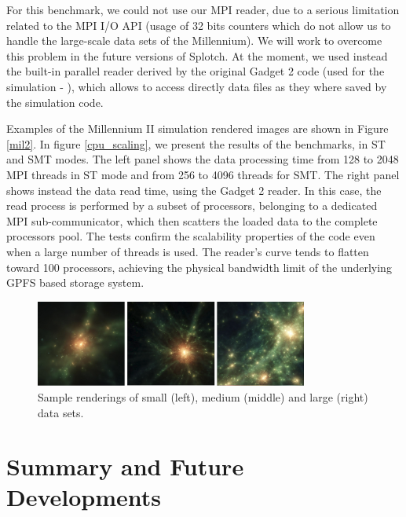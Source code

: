 \documentclass[1p,times]{elsarticle}
\begin{document}
For this benchmark, we could not use our MPI reader, due to a serious limitation related 
to the MPI I/O API (usage of 32 bits counters which do not allow us to handle the large-scale data sets of the Millennium).
We will work to overcome this problem in the future versions of Splotch. 
At the moment, we used instead the built-in parallel reader derived by the original Gadget 2 code 
(used for the simulation - \cite{gadget}), 
which allows to access directly data files as they where saved by the simulation code. 

Examples of the Millennium II simulation rendered images are shown in Figure \ref{mil2}.
In figure \ref{cpu_scaling}, we present the results of the benchmarks, in ST and SMT modes.
The left panel shows the data processing time from 128 to 2048 MPI threads in ST mode and from
256 to 4096 threads for SMT. The right panel shows instead the data read time, using 
the Gadget 2 reader. In this case, the read process is performed by a subset of processors,
belonging to a dedicated MPI sub-communicator, which then scatters the loaded data to the complete
processors pool. The tests confirm the scalability properties of the code even when a large number
of threads is used. The reader's curve tends to flatten toward 100 processors, achieving 
the physical bandwidth limit of the underlying GPFS based storage system. 

\begin{figure}
\begin{center}
\includegraphics[width=0.8\textwidth]{cu_images.png}
\end{center}
\caption{Sample renderings of small (left), medium (middle) and large (right) data sets.}\label{cudafig}
\end{figure}

\section{Summary and Future Developments}
\label{conclusions}
\end{document}
